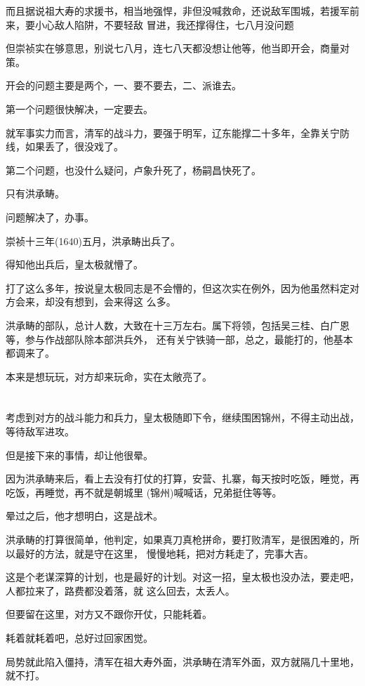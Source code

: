 \documentclass[11pt,a4paper,onecolumn]{article}
\begin{document}
而且据说祖大寿的求援书，相当地强悍，非但没喊救命，还说敌军围城，若援军前来，要小心敌人陷阱，不要轻敌
冒进，我还撑得住，七八月没问题

但崇祯实在够意思，别说七八月，连七八天都没想让他等，他当即开会，商量对策。

开会的问题主要是两个，一、要不要去，二、派谁去。

第一个问题很快解决，一定要去。

就军事实力而言，清军的战斗力，要强于明军，辽东能撑二十多年，全靠关宁防线，如果丢了，很没戏了。

第二个问题，也没什么疑问，卢象升死了，杨嗣昌快死了。

只有洪承畴。

问题解决了，办事。

崇祯十三年(1640)五月，洪承畴出兵了。

得知他出兵后，皇太极就懵了。

打了这么多年，按说皇太极同志是不会懵的，但这次实在例外，因为他虽然料定对方会来，却没有想到，会来得这
么多。

洪承畴的部队，总计人数，大致在十三万左右。属下将领，包括吴三桂、白广恩等，参与作战部队除本部洪兵外，
还有关宁铁骑一部，总之，最能打的，他基本都调来了。

本来是想玩玩，对方却来玩命，实在太敞亮了。

\section[\thesection]{}

考虑到对方的战斗能力和兵力，皇太极随即下令，继续围困锦州，不得主动出战，等待敌军进攻。

但是接下来的事情，却让他很晕。

因为洪承畴来后，看上去没有打仗的打算，安营、扎寨，每天按时吃饭，睡觉，再吃饭，再睡觉，再不就是朝城里
(锦州)喊喊话，兄弟挺住等等。

晕过之后，他才想明白，这是战术。

洪承畴的打算很简单，他判定，如果真刀真枪拼命，要打败清军，是很困难的，所以最好的方法，就是守在这里，
慢慢地耗，把对方耗走了，完事大吉。

这是个老谋深算的计划，也是最好的计划。对这一招，皇太极也没办法，要走吧，人都拉来了，路费都没着落，就
这么回去，太丢人。

但要留在这里，对方又不跟你开仗，只能耗着。

耗着就耗着吧，总好过回家困觉。

局势就此陷入僵持，清军在祖大寿外面，洪承畴在清军外面，双方就隔几十里地，就不打。
\end{document}
